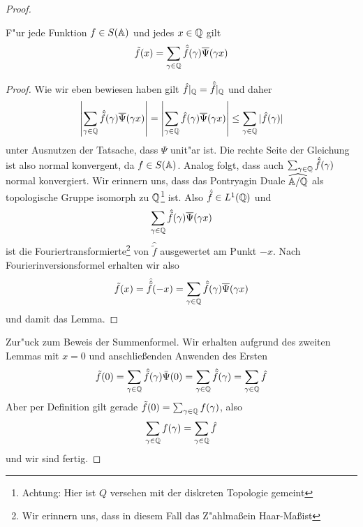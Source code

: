 \begin{proof}
		\begin{lemma}
			F"ur jede Funktion $f \in S(\mathbb{A})$ und jedes $x\in \mathbb{Q}$ gilt
			\begin{align*}
				\tilde{f}(x) = \sum_{\gamma \in \mathbb{Q}} {\hat{\tilde{f}}(\gamma)\overline{\Psi}(\gamma x)}
			\end{align*}
		\end{lemma}
		\begin{proof}
			Wie wir eben bewiesen haben gilt $\hat{f}|_{\mathbb{Q}} = \hat{\tilde{f}}|_{\mathbb{Q}}$ und daher
			\begin{align*}
				\left| \sum_{\gamma \in \mathbb{Q}} {\hat{\tilde{f}}(\gamma)\overline{\Psi}(\gamma x)}\right| = 
				\left| \sum_{\gamma \in \mathbb{Q}} {\hat{f}(\gamma)\overline{\Psi}(\gamma x)}\right| 
				\leq \sum_{\gamma \in \mathbb{Q}} {|\hat{f}(\gamma)|}
			\end{align*}
			unter Ausnutzen der Tatsache, dass $\Psi$ unit"ar ist. Die rechte Seite der Gleichung ist also normal konvergent, da $f \in S(\mathbb{A})$. Analog folgt, dass auch $\sum_{\gamma \in \mathbb{Q}} {\hat{\tilde{f}}(\gamma)}$ normal konvergiert. Wir erinnern uns, dass das Pontryagin Duale $\widehat{\mathbb{A}/\mathbb{Q}}$ als topologische Gruppe isomorph zu $\mathbb{Q}$\footnote{Achtung: Hier ist $Q$ versehen mit der diskreten Topologie gemeint} ist. Also $\hat{\tilde{f}} \in L^1(\mathbb{Q})$ und
			\begin{align*}
				\sum_{\gamma \in \mathbb{Q}} {\hat{\tilde{f}}(\gamma)\overline{\Psi}(\gamma x)}
			\end{align*}
			ist die Fouriertransformierte\footnote{Wir erinnern uns, dass in diesem Fall das Z"ahlma\ss ein Haar-Ma\ss ist} von $\hat{\tilde{f}}$ ausgewertet am Punkt $-x$. Nach Fourierinversionsformel erhalten wir also
			\begin{align*}
				\tilde{f}(x) = \hat{\hat{\tilde{f}}}(-x) = \sum_{\gamma \in \mathbb{Q}} {\hat{\tilde{f}}(\gamma)\overline{\Psi}(\gamma x)}
			\end{align*}
			und damit das Lemma.
		\end{proof}
		Zur"uck zum Beweis der Summenformel. Wir erhalten aufgrund des zweiten Lemmas mit $x=0$ und anschlie\ss enden Anwenden des Ersten
		\begin{align*}
			\tilde{f}(0) = 	\sum_{\gamma \in \mathbb{Q}} \hat{\tilde{f}}(\gamma) \bar{\Psi}(0) =
							\sum_{\gamma \in \mathbb{Q}} \hat{\tilde{f}}(\gamma) =
							\sum_{\gamma \in \mathbb{Q}} \hat{f}
		\end{align*}
		Aber per Definition gilt gerade $\tilde{f}(0) = \sum_{\gamma \in \mathbb{Q}}f(\gamma)$, also
		\begin{align*}
			\sum_{\gamma \in \mathbb{Q}}f(\gamma) = \sum_{\gamma \in \mathbb{Q}} \hat{f}
		\end{align*}
		und wir sind fertig.
	\end{proof}